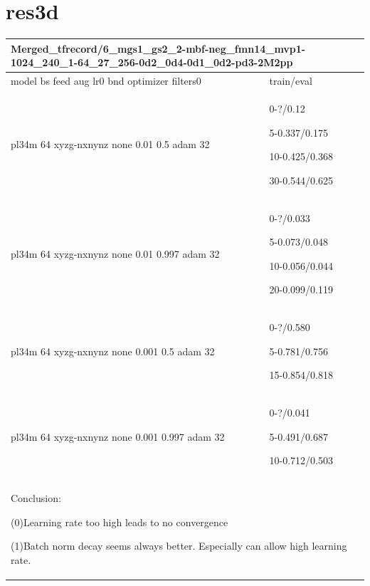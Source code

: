 \documentclass{article}
\begin{document}
\section{res3d}
\noindent
\begin{tabular}{|p{10cm}|p{5cm}| }
	\hline
	\multicolumn{2}{|p{15cm}|}{Merged\_tfrecord/6\_mgs1\_gs2\_2-mbf-neg\_fmn14\_mvp1-1024\_240\_1-64\_27\_256-0d2\_0d4-0d1\_0d2-pd3-2M2pp}\\
	\hline
	model bs feed aug lr0 bnd optimizer filters0 & train/eval \\
	\hline
	pl34m 64 xyzg-nxnynz none 0.01 0.5 adam 32 &0-?/0.12\par 5-0.337/0.175\par 10-0.425/0.368\par 30-0.544/0.625 \\
	\hline
	pl34m 64 xyzg-nxnynz none 0.01 0.997 adam 32 &0-?/0.033\par 5-0.073/0.048\par 10-0.056/0.044\par 20-0.099/0.119\\
	\hline
	pl34m 64 xyzg-nxnynz none 0.001 0.5 adam 32 & 0-?/0.580\par 5-0.781/0.756\par 
	15-0.854/0.818\\
	\hline
	pl34m 64 xyzg-nxnynz none 0.001 0.997 adam 32 & 0-?/0.041\par 5-0.491/0.687\par 10-0.712/0.503\\
	\hline
	
	\multicolumn{2}{|p{15cm}|}{ Conclusion:\par	
		(0)Learning rate too high leads to no convergence\par
		(1)Batch norm decay seems always better. Especially can allow high learning rate.  } \\
	\hline	
\end{tabular}
\end{document}
